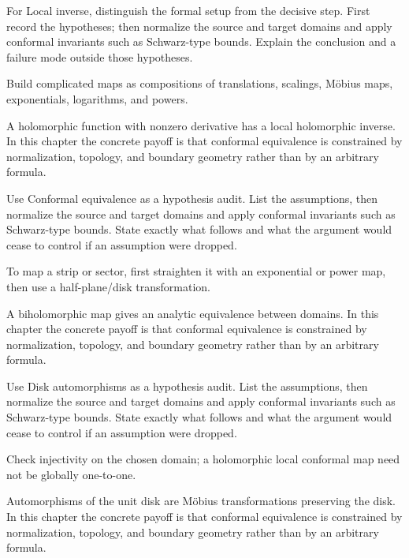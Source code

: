\begin{exercise}\label{exr:iv17-03}
For Local inverse, distinguish the formal setup from the decisive step. First record the hypotheses; then normalize the source and target domains and apply conformal invariants such as Schwarz-type bounds. Explain the conclusion and a failure mode outside those hypotheses.
\end{exercise}
\begin{hint}
Build complicated maps as compositions of translations, scalings, Möbius maps, exponentials, logarithms, and powers.
\end{hint}
\begin{solution}
A holomorphic function with nonzero derivative has a local holomorphic inverse. In this chapter the concrete payoff is that conformal equivalence is constrained by normalization, topology, and boundary geometry rather than by an arbitrary formula.
\end{solution}

\begin{exercise}\label{exr:iv17-04}
Use Conformal equivalence as a hypothesis audit. List the assumptions, then normalize the source and target domains and apply conformal invariants such as Schwarz-type bounds. State exactly what follows and what the argument would cease to control if an assumption were dropped.
\end{exercise}
\begin{hint}
To map a strip or sector, first straighten it with an exponential or power map, then use a half-plane/disk transformation.
\end{hint}
\begin{solution}
A biholomorphic map gives an analytic equivalence between domains. In this chapter the concrete payoff is that conformal equivalence is constrained by normalization, topology, and boundary geometry rather than by an arbitrary formula.
\end{solution}

\begin{exercise}\label{exr:iv17-05}
Use Disk automorphisms as a hypothesis audit. List the assumptions, then normalize the source and target domains and apply conformal invariants such as Schwarz-type bounds. State exactly what follows and what the argument would cease to control if an assumption were dropped.
\end{exercise}
\begin{hint}
Check injectivity on the chosen domain; a holomorphic local conformal map need not be globally one-to-one.
\end{hint}
\begin{solution}
Automorphisms of the unit disk are Möbius transformations preserving the disk. In this chapter the concrete payoff is that conformal equivalence is constrained by normalization, topology, and boundary geometry rather than by an arbitrary formula.
\end{solution}

